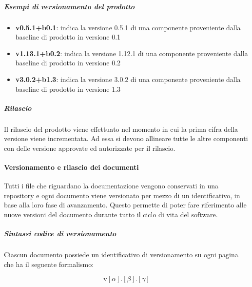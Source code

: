 		\subparagraph{Esempi di versionamento del prodotto}

		\begin{itemize}
			\item \textbf{v0.5.1+b0.1}: indica la versione 0.5.1 di una componente proveniente dalla baseline di prodotto in versione 0.1
			\item \textbf{v1.13.1+b0.2}:  indica la versione 1.12.1 di una componente proveniente dalla baseline di prodotto in versione 0.2
			\item \textbf{v3.0.2+b1.3}: indica la versione 3.0.2 di una componente proveniente dalla baseline di prodotto in versione 1.3
		\end{itemize}

		\subparagraph{Rilascio}

		Il rilascio del prodotto viene effettuato nel momento in cui la prima cifra della versione viene incrementata. Ad essa si devono allineare tutte le altre componenti con delle versione approvate ed autorizzate per il rilascio. 

	\paragraph{Versionamento e rilascio dei documenti}

	Tutti i file che riguardano la documentazione vengono conservati in una repository e ogni documento viene versionato per mezzo di un identificativo, in base alla loro fase di avanzamento. Questo permette di poter fare riferimento alle nuove versioni del documento durante tutto il ciclo di vita del software.

		\subparagraph{Sintassi codice di versionamento}

		Ciascun documento possiede un identificativo di versionamento su ogni pagina che ha il seguente formalismo:

		\[%
			\text{v}[\alpha].[\beta].[\gamma]
		\]

